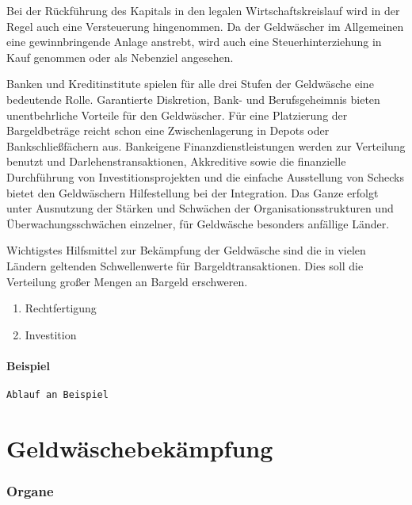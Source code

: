 \documentclass{article}
\begin{document}
\begin{enumerate}
			Bei der Rückführung des Kapitals in den legalen Wirtschaftskreislauf wird in der Regel auch eine Versteuerung hingenommen. Da der Geldwäscher im Allgemeinen eine gewinnbringende 	Anlage anstrebt, wird auch eine Steuerhinterziehung in Kauf genommen oder als Nebenziel angesehen.

			Banken und Kreditinstitute spielen für alle drei Stufen der Geldwäsche eine bedeutende Rolle. Garantierte Diskretion, Bank- und Berufsgeheimnis bieten unentbehrliche Vorteile für den Geldwäscher. Für eine Platzierung der Bargeldbeträge reicht schon eine Zwischenlagerung in Depots oder Bankschließfächern aus. Bankeigene Finanzdienstleistungen werden zur Verteilung benutzt und Darlehenstransaktionen, Akkreditive sowie die finanzielle Durchführung von Investitionsprojekten und die einfache Ausstellung von Schecks bietet den Geldwäschern Hilfestellung bei der Integration. Das Ganze erfolgt unter Ausnutzung der Stärken und Schwächen der Organisationsstrukturen und Überwachungsschwächen einzelner, für Geldwäsche besonders anfällige Länder.	

			Wichtigstes Hilfsmittel zur Bekämpfung der Geldwäsche sind die in vielen Ländern geltenden Schwellenwerte für Bargeldtransaktionen. Dies soll die Verteilung großer Mengen an Bargeld erschweren.

                        \begin{enumerate}
                            \item Rechtfertigung
                            \item Investition
                        \end{enumerate}

                \end{enumerate}


        \subsection[Beispiel]{Beispiel}
            \texttt{Ablauf an Beispiel}

\newpage

\part[Bekämpfung]{Geldwäschebekämpfung}

    \section[Organe]{Organe}
\end{document}
